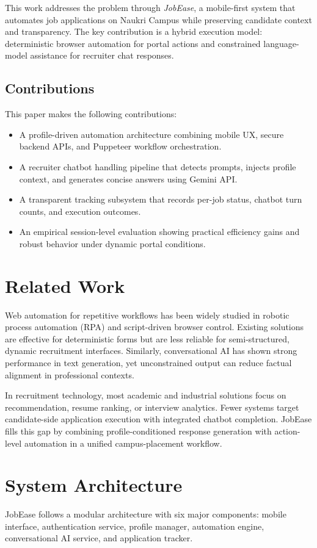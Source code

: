 \documentclass[conference]{IEEEtran}
\begin{document}
This work addresses the problem through \textit{JobEase}, a mobile-first system that automates job applications on Naukri Campus while preserving candidate context and transparency. The key contribution is a hybrid execution model: deterministic browser automation for portal actions and constrained language-model assistance for recruiter chat responses.

\subsection{Contributions}
This paper makes the following contributions:
\begin{itemize}
    \item A profile-driven automation architecture combining mobile UX, secure backend APIs, and Puppeteer workflow orchestration.
    \item A recruiter chatbot handling pipeline that detects prompts, injects profile context, and generates concise answers using Gemini API.
    \item A transparent tracking subsystem that records per-job status, chatbot turn counts, and execution outcomes.
    \item An empirical session-level evaluation showing practical efficiency gains and robust behavior under dynamic portal conditions.
\end{itemize}

\section{Related Work}
Web automation for repetitive workflows has been widely studied in robotic process automation (RPA) and script-driven browser control. Existing solutions are effective for deterministic forms but are less reliable for semi-structured, dynamic recruitment interfaces. Similarly, conversational AI has shown strong performance in text generation, yet unconstrained output can reduce factual alignment in professional contexts.

In recruitment technology, most academic and industrial solutions focus on recommendation, resume ranking, or interview analytics. Fewer systems target candidate-side application execution with integrated chatbot completion. JobEase fills this gap by combining profile-conditioned response generation with action-level automation in a unified campus-placement workflow.

\section{System Architecture}
JobEase follows a modular architecture with six major components: mobile interface, authentication service, profile manager, automation engine, conversational AI service, and application tracker.
\end{document}
